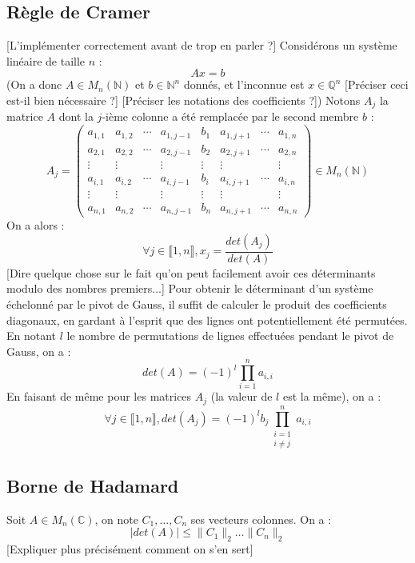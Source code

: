 \documentclass[french]{article}
\begin{document}
\subsection{Règle de Cramer} \label{subsec:cramer}
[L'implémenter correctement avant de trop en parler ?]
\newline
Considérons un système linéaire de taille $n$ :
$$ A x = b$$
(On a donc $A \in M_n(\mathbb{N})$ et $b \in \mathbb{N}^n$ donnés, et l'inconnue est $x \in \mathbb{Q}^n$ [Préciser ceci est-il bien nécessaire ?] [Préciser les notations des coefficients ?])
\newline
Notons $A_j$ la matrice $A$ dont la $j$-ième colonne a été remplacée par le second membre $b$ :
\begin{equation*}
	A_j = 
	\begin{pmatrix}
		a_{1,1} & a_{1,2} & \cdots & a_{1,j-1} & b_1 & a_{1,j+1} & \cdots & a_{1,n}\\
		a_{2,1} & a_{2,2} & \cdots & a_{2,j-1} & b_2 & a_{2,j+1} & \cdots & a_{2,n}\\
		\vdots  & \vdots  & & \vdots & \vdots & \vdots & & \vdots\\
		a_{i,1} & a_{i,2} & \cdots & a_{i,j-1} & b_i & a_{i,j+1} & \cdots & a_{i,n}\\
		\vdots  & \vdots  & & \vdots & \vdots & \vdots & & \vdots\\
		a_{n,1} & a_{n,2} & \cdots & a_{n,j-1} & b_n & a_{n,j+1} &\cdots & a_{n,n}
	\end{pmatrix}
	\in M_n(\mathbb{N})
\end{equation*}
On a alors :
$$ \forall j \in \llbracket1,n\rrbracket, x_j = \frac{det(A_j)}{det(A)}$$
[Dire quelque chose sur le fait qu'on peut facilement avoir ces déterminants modulo des nombres premiers...]
\newline
\newline
Pour obtenir le déterminant d'un système échelonné par le pivot de Gauss, il suffit de calculer le produit des coefficients diagonaux, en gardant à l'esprit que des lignes ont potentiellement été permutées. En notant $l$ le nombre de permutations de lignes effectuées pendant le pivot de Gauss, on a :
$$ det(A) = (-1)^l\prod_{i = 1}^na_{i,i}$$
En faisant de même pour les matrices $A_j$ (la valeur de $l$ est la même), on a :
$$ \forall j \in \llbracket1,n\rrbracket, det(A_j) = (-1)^l b_j \prod_{\substack{i=1 \\ i\neq j}}^na_{i,i}$$
\subsection{Borne de Hadamard}
Soit $A \in M_n(\mathbb{C})$, on note $C_1,\hdots,C_n$ ses vecteurs colonnes. On a :
$$ \lvert det(A) \rvert \le \lVert C_1 \rVert_2 \hdots \lVert C_n \rVert_2$$
[Expliquer plus précisément comment on s'en sert]
\end{document}
